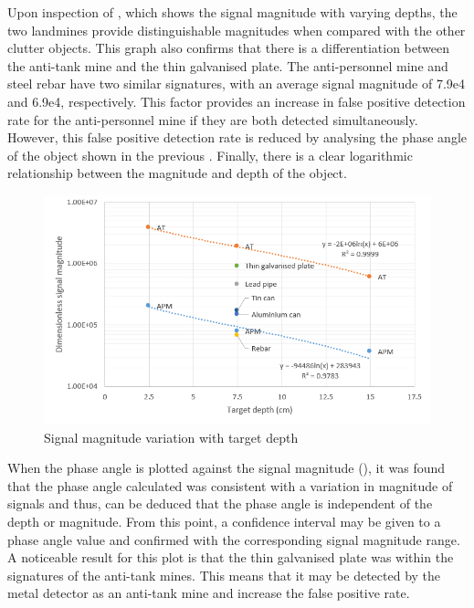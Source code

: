 \documentclass[main.tex]{subfiles}
\begin{document}
Upon inspection of , which shows the signal magnitude with varying depths, the two landmines provide distinguishable magnitudes when compared with the other clutter objects. This graph also confirms that there is a differentiation between the anti-tank mine and the thin galvanised plate. The anti-personnel mine and steel rebar have two similar signatures, with an average signal magnitude of 7.9e4 and 6.9e4, respectively. This factor provides an increase in false positive detection rate for the anti-personnel mine if they are both detected simultaneously. However, this false positive detection rate is reduced by analysing the phase angle of the object shown in the previous . Finally, there is a clear logarithmic relationship between the magnitude and depth of the object. 

\begin{figure}[!ht]
\includegraphics[width=\textwidth]{5-Testing/magDepth.PNG}
\centering
\caption{Signal magnitude variation with target depth }
\end{figure}

When the phase angle is plotted against the signal magnitude (), it was found that the phase angle calculated was consistent with a variation in magnitude of signals and thus, can be deduced that the phase angle is independent of the depth or magnitude. From this point, a confidence interval may be given to a phase angle value and confirmed with the corresponding signal magnitude range. A noticeable result for this plot is that the thin galvanised plate was within the signatures of the anti-tank mines. This means that it may be detected by the metal detector as an anti-tank mine and increase the false positive rate. 
\end{document}

